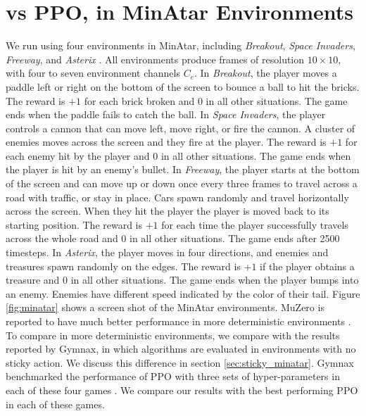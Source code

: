 \section{\moozi vs PPO, in MinAtar Environments} \label{sec:exp:minatar}
We run \moozi using four environments in MinAtar, including \textit{Breakout}, \textit{Space Invaders}, \textit{Freeway}, and \textit{Asterix} \cite{MinAtarAtariInspiredTestbed_Young.Tian_2019}.
All environments produce frames of resolution $10 \times 10$, with four to seven environment channels $C_e$.
In \textit{Breakout}, the player moves a paddle left or right on the bottom of the screen to bounce a ball to hit the bricks.
The reward is $+1$ for each brick broken and $0$ in all other situations.
The game ends when the paddle fails to catch the ball.
In \textit{Space Invaders}, the player controls a cannon that can move left, move right, or fire the cannon.
A cluster of enemies moves across the screen and they fire at the player.
The reward is $+1$ for each enemy hit by the player and $0$ in all other situations.
The game ends when the player is hit by an enemy's bullet.
In \textit{Freeway}, the player starts at the bottom of the screen and can move up or down once every three frames to travel across a road with traffic, or stay in place.
Cars spawn randomly and travel horizontally across the screen.
When they hit the player the player is moved back to its starting position.
The reward is $+1$ for each time the player successfully travels across the whole road and $0$ in all other situations.
The game ends after 2500 timesteps.
In \textit{Asterix}, the player moves in four directions, and enemies and treasures spawn randomly on the edges.
The reward is $+1$ if the player obtains a treasure and $0$ in all other situations.
The game ends when the player bumps into an enemy.
Enemies have different speed indicated by the color of their tail.
Figure \ref{fig:minatar} shows a screen shot of the MinAtar environments.
MuZero is reported to have much better performance in more deterministic environments \cite{VectorQuantizedModels_Ozair.Li.ea_2021}.
To compare \moozi in more deterministic environments, we compare with the results reported by Gymnax, in which algorithms are evaluated in environments with no sticky action.
We discuss this difference in section \ref{sec:sticky_minatar}.
Gymnax benchmarked the performance of PPO with three sets of hyper-parameters in each of these four games \cite{GymnaxJAXbasedReinforcement_RobertTjarkoLange_2022,ProximalPolicyOptimization_Schulman.Wolski.ea_2017}.
We compare our results with the best performing PPO in each of these games.

